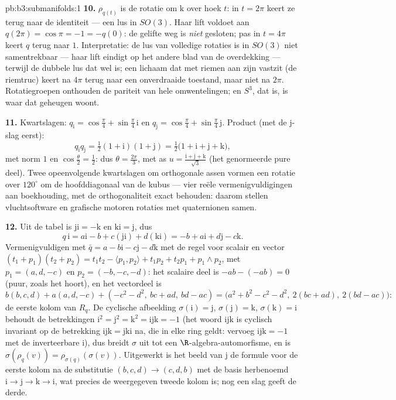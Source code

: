 \begin{solution}{pb:b3:submanifolds:1}
\textbf{10.} $\rho_{q(t)}$ is de rotatie om $\mathrm k$ over hoek
$t$: in $t = 2\pi$ keert ze terug naar de identiteit --- een lus
in $SO(3)$. Haar lift voldoet aan $q(2\pi) = \cos\pi = -1 =
-q(0)$: de gelifte weg is \emph{niet} gesloten; pas in $t = 4\pi$
keert $q$ terug naar $1$. Interpretatie: de lus van volledige
rotaties is in $SO(3)$ niet samentrekbaar --- haar lift eindigt
op het andere blad van de overdekking --- terwijl de dubbele lus
dat wel is; een lichaam dat met riemen aan zijn  vastzit
(de riemtruc) keert na $4\pi$ terug naar een onverdraaide
toestand, maar niet na $2\pi$. Rotatiegroepen onthouden de
pariteit van hele omwentelingen; en $S^3$, dat  is, is waar dat geheugen woont.

\textbf{11.} Kwartslagen: $q_{\mathrm i} = \cos\frac\pi4 +
\sin\frac\pi4\,\mathrm i$ en $q_{\mathrm j} = \cos\frac\pi4 +
\sin\frac\pi4\,\mathrm j$. Product (met de $\mathrm j$-slag
eerst):
\[
q_{\mathrm i}q_{\mathrm j} = \tfrac12(1 + \mathrm i)(1 +
\mathrm j) = \tfrac12\bigl(1 + \mathrm i + \mathrm j +
\mathrm k\bigr),
\]
met norm $1$ en $\cos\frac\theta2 = \frac12$: dus $\theta =
\frac{2\pi}3$, met as $u = \frac{\mathrm i + \mathrm j + \mathrm
k}{\sqrt3}$ (het genormeerde pure deel). Twee opeenvolgende
kwartslagen om orthogonale assen vormen een rotatie over
$120^\circ$ om de hoofddiagonaal van de kubus --- vier reële
vermenigvuldigingen aan boekhouding, met de orthogonaliteit exact
behouden: daarom stellen vluchtsoftware en grafische motoren
rotaties met quaternionen samen.

\textbf{12.} Uit de tabel is $\mathrm{ji} = -\mathrm k$ en
$\mathrm{ki} = \mathrm j$, dus
\[
q\,\mathrm i = a\mathrm i - b + c(\mathrm{ji}) +
d(\mathrm{ki}) = -b + a\mathrm i + d\mathrm j - c\mathrm k .
\]
Vermenigvuldigen met $\bar q = a - b\mathrm i - c\mathrm j -
d\mathrm k$ met de regel voor scalair en vector $(t_1 + p_1)(t_2
+ p_2) = t_1t_2 - \langle p_1, p_2\rangle + t_1p_2 + t_2p_1 +
p_1\wedge p_2$, met $p_1 = (a, d, -c)$ en $p_2 = (-b, -c, -d)$:
het scalaire deel is $-ab - (-ab) = 0$ (puur, zoals het hoort),
en het vectordeel is
\[
b(b, c, d) + a(a, d, -c) + (-c^2 - d^2,\ bc + ad,\ bd - ac)
= \bigl(a^2 + b^2 - c^2 - d^2,\ 2(bc + ad),\ 2(bd -
ac)\bigr):
\]
de eerste kolom van $R_q$. De cyclische afbeelding
$\sigma(\mathrm i) = \mathrm j$, $\sigma(\mathrm j) = \mathrm k$,
$\sigma(\mathrm k) = \mathrm i$ behoudt de betrekkingen $\mathrm
i^2 = \mathrm j^2 = \mathrm k^2 = \mathrm{ijk} = -1$ (het woord
$\mathrm{ijk}$ is cyclisch invariant op de betrekking
$\mathrm{ijk} = \mathrm{jki}$ na, die in elke ring geldt: vervoeg
$\mathrm{ijk} = -1$ met de inverteerbare $\mathrm i$), dus breidt
$\sigma$ uit tot een $\R$-algebra-automorfisme, en is
$\sigma(\rho_q(v)) = \rho_{\sigma(q)}(\sigma(v))$. Uitgewerkt is
het beeld van $\mathrm j$ de formule voor de eerste kolom na de
substitutie $(b, c, d) \to (c, d, b)$ met de basis herbenoemd
$\mathrm i \to \mathrm j \to \mathrm k \to \mathrm i$, wat
precies de weergegeven tweede kolom is; nog een slag geeft de
derde.


\end{solution}
